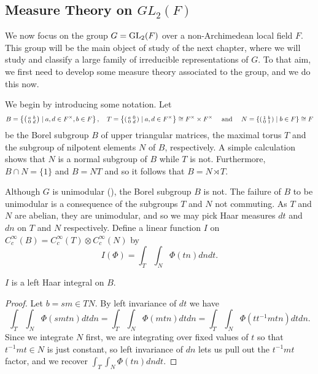 \subsection{Measure Theory on \texorpdfstring{$GL_2(F)$}{TEXT}}

We now focus on the group $G=\mathrm{GL}_2(F)$ over a non-Archimedean local field $F$. This group will be the main object of study of the next chapter, where we will study and classify a large family of irreducible representations of $G$. To that aim, we first need to develop some measure theory associated to the group, and we do this now.

We begin by introducing some notation. Let $$B=\left\{\begin{psmallmatrix} a&b\\0&d\end{psmallmatrix} \mid a,d \in F^\times, b \in F\right\},\quad T=\left\{\begin{psmallmatrix}
    a&0\\0&d
\end{psmallmatrix}\mid a,d \in F^\times\right\} \cong F^\times \times F^\times\quad\text{ and }\quad N=\left\{\begin{psmallmatrix}
    1&b\\0&1
\end{psmallmatrix}\mid b \in F\right\}\cong F$$ be the Borel subgroup $B$ of upper triangular matrices, the maximal torus $T$ and the subgroup of nilpotent elements $N$ of $B$, respectively. A simple calculation shows that $N$ is a normal subgroup of $B$ while $T$ is not. Furthermore, $B\cap N=\{1\}$ and $B=NT$ and so it follows that $B=N \rtimes T$.

Although $G$ is unimodular (\cite[Proposition 7.5]{BH1}), the Borel subgroup $B$ is not. The failure of $B$ to be unimodular is a consequence of the subgroups $T$ and $N$ not commuting. As $T$ and $N$ are abelian, they are unimodular, and so we may pick Haar measures $dt$ and $dn$ on $T$ and $N$ respectively. Define a linear function $I$ on $C_c^\infty(B) = C_c^\infty(T) \otimes C_c^\infty(N)$ by
$$I(\Phi) = \int_T\int_N \Phi(tn) dn dt.$$

\begin{prop}
    $I$ is a left Haar integral on $B$.
\end{prop}
\begin{proof}
    Let $b=sm \in TN$. By left invariance of $dt$ we have
    $$\int_T\int_N \Phi(smtn)dtdn = \int_T\int_N \Phi(mtn)dtdn = \int_T\int_N \Phi(tt^{-1}mtn)dtdn.$$
    Since we integrate $N$ first, we are integrating over fixed values of $t$ so that $t^{-1}mt \in N$ is just constant, so left invariance of $dn$ lets us pull out the $t^{-1}mt$ factor, and we recover $\int_T\int_N \Phi(tn) dn dt$.
\end{proof}

